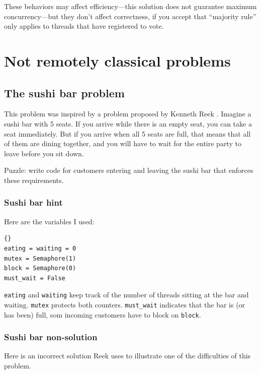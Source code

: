 \documentclass{book}
\newcommand{\clearemptydoublepage}{\newpage\cleardoublepage}
\begin{document}
These behaviors may affect efficiency---this solution does
not guarantee maximum concurrency---but they don't affect
correctness, if you accept that ``majority rule'' only applies
to threads that have registered to vote.


\clearemptydoublepage
\chapter{Not remotely classical problems}


\section{The sushi bar problem}

This problem was inspired by a problem proposed by Kenneth Reek \cite{reek}.
Imagine a sushi bar with 5 seats.  If you arrive while there is an
empty seat, you can take a seat immediately.  But if you arrive when
all 5 seats are full, that means that all of them are dining together,
and you will have to wait for the entire party to leave before you
sit down.

Puzzle: write code for customers entering and
leaving the sushi bar that enforces these requirements.

\clearemptydoublepage
\subsection {Sushi bar hint}

Here are the variables I used:

\begin{latin}
\begin{lstlisting}[title={Sushi bar hint}]{}
eating = waiting = 0
mutex = Semaphore(1)
block = Semaphore(0)
must_wait = False
\end{lstlisting}
\end{latin}

{\tt eating} and {\tt waiting} keep track of the number of
threads sitting at the bar and waiting.  {\tt mutex} protects
both counters.  {\tt must\_wait} indicates that the bar is (or
has been) full, som incoming customers have to block
on {\tt block}.


\clearemptydoublepage
\subsection {Sushi bar non-solution}

Here is an incorrect solution Reek uses to illustrate one
of the difficulties of this problem.
\end{document}
